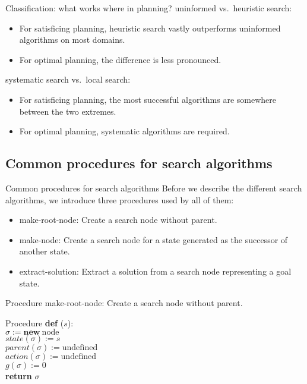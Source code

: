 \documentclass{gkibeamer}
\begin{document}
\begin{frame}{Classification: what works where in planning?}
  uninformed vs.\ heuristic search:
  \begin{itemize}
  \item For \alert{satisficing} planning, heuristic search
    vastly outperforms uninformed algorithms on most domains.
  \item For \alert{optimal} planning, the difference is less
    pronounced.%
  \end{itemize}

  \medskip

  systematic search vs.\ local search:
  \begin{itemize}
  \item For \alert{satisficing} planning, the most successful
    algorithms are somewhere between the two extremes.
  \item For \alert{optimal} planning, systematic algorithms are
    required.
  \end{itemize}
\end{frame}

\subsection[Common procedures]{Common procedures for search
  algorithms}

\begin{frame}{Common procedures for search algorithms}
  Before we describe the different search algorithms, we introduce
  three procedures used by all of them:
  \begin{itemize}
  \item \alert{make-root-node:} Create a search node without parent.
  \item \alert{make-node:} Create a search node for a state generated
    as the successor of another state.
  \item \alert{extract-solution:} Extract a solution from a search
    node representing a goal state.
  \end{itemize}
\end{frame}

\begin{frame}{Procedure }
  \alert{make-root-node:} Create a search node without parent.
  \begin{block}{Procedure }
    \textbf{def} ($s$): \\
    {}\qquad $\sigma := \textbf{new}~\text{node}$ \\
    {}\qquad $\textit{state}(\sigma) := s$ \\
    {}\qquad $\textit{parent}(\sigma) := \text{undefined}$ \\
    {}\qquad $\textit{action}(\sigma) := \text{undefined}$ \\
    {}\qquad $g(\sigma) := 0$ \\
    {}\qquad \textbf{return} $\sigma$
  \end{block}
\end{frame}
\end{document}
